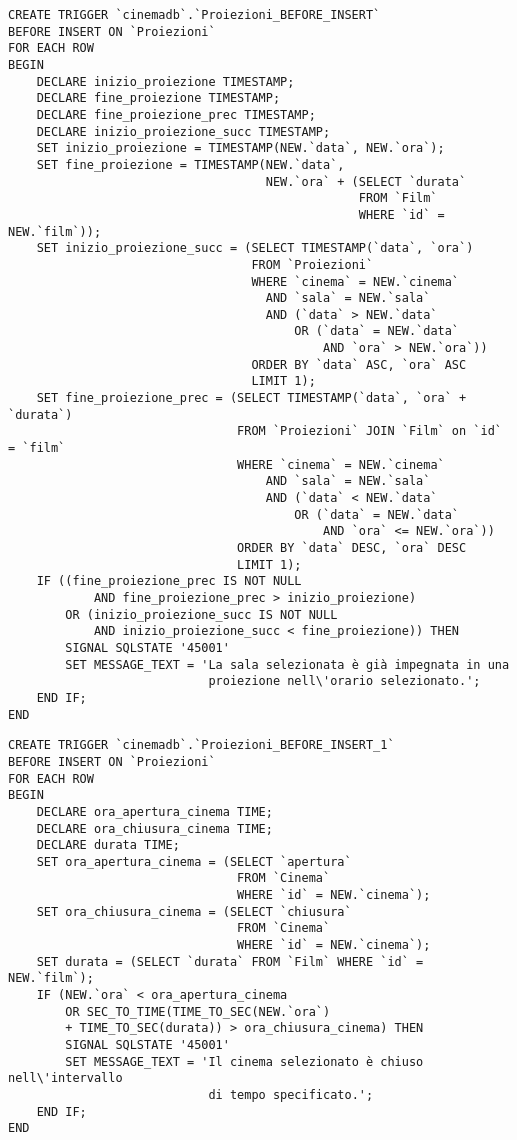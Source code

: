\pagebreak
\begin{verbatim}
CREATE TRIGGER `cinemadb`.`Proiezioni_BEFORE_INSERT`
BEFORE INSERT ON `Proiezioni`
FOR EACH ROW
BEGIN
    DECLARE inizio_proiezione TIMESTAMP;
    DECLARE fine_proiezione TIMESTAMP;
    DECLARE fine_proiezione_prec TIMESTAMP;
    DECLARE inizio_proiezione_succ TIMESTAMP;
    SET inizio_proiezione = TIMESTAMP(NEW.`data`, NEW.`ora`);
    SET fine_proiezione = TIMESTAMP(NEW.`data`,
                                    NEW.`ora` + (SELECT `durata`
                                                 FROM `Film`
                                                 WHERE `id` = NEW.`film`));
    SET inizio_proiezione_succ = (SELECT TIMESTAMP(`data`, `ora`)
                                  FROM `Proiezioni`
                                  WHERE `cinema` = NEW.`cinema`
                                    AND `sala` = NEW.`sala`
                                    AND (`data` > NEW.`data`
                                        OR (`data` = NEW.`data`
                                            AND `ora` > NEW.`ora`))
                                  ORDER BY `data` ASC, `ora` ASC
                                  LIMIT 1);
    SET fine_proiezione_prec = (SELECT TIMESTAMP(`data`, `ora` + `durata`)
                                FROM `Proiezioni` JOIN `Film` on `id` = `film`
                                WHERE `cinema` = NEW.`cinema`
                                    AND `sala` = NEW.`sala`
                                    AND (`data` < NEW.`data`
                                        OR (`data` = NEW.`data`
                                            AND `ora` <= NEW.`ora`))
                                ORDER BY `data` DESC, `ora` DESC
                                LIMIT 1);
    IF ((fine_proiezione_prec IS NOT NULL
            AND fine_proiezione_prec > inizio_proiezione)
        OR (inizio_proiezione_succ IS NOT NULL
            AND inizio_proiezione_succ < fine_proiezione)) THEN
        SIGNAL SQLSTATE '45001'
        SET MESSAGE_TEXT = 'La sala selezionata è già impegnata in una
                            proiezione nell\'orario selezionato.';
    END IF;
END
\end{verbatim}

\pagebreak
\begin{verbatim}
CREATE TRIGGER `cinemadb`.`Proiezioni_BEFORE_INSERT_1`
BEFORE INSERT ON `Proiezioni`
FOR EACH ROW
BEGIN
    DECLARE ora_apertura_cinema TIME;
    DECLARE ora_chiusura_cinema TIME;
    DECLARE durata TIME;
    SET ora_apertura_cinema = (SELECT `apertura`
                                FROM `Cinema`
                                WHERE `id` = NEW.`cinema`);
    SET ora_chiusura_cinema = (SELECT `chiusura`
                                FROM `Cinema`
                                WHERE `id` = NEW.`cinema`);
    SET durata = (SELECT `durata` FROM `Film` WHERE `id` = NEW.`film`);
    IF (NEW.`ora` < ora_apertura_cinema
        OR SEC_TO_TIME(TIME_TO_SEC(NEW.`ora`)
        + TIME_TO_SEC(durata)) > ora_chiusura_cinema) THEN
        SIGNAL SQLSTATE '45001'
        SET MESSAGE_TEXT = 'Il cinema selezionato è chiuso nell\'intervallo
                            di tempo specificato.';
    END IF;
END
\end{verbatim}

